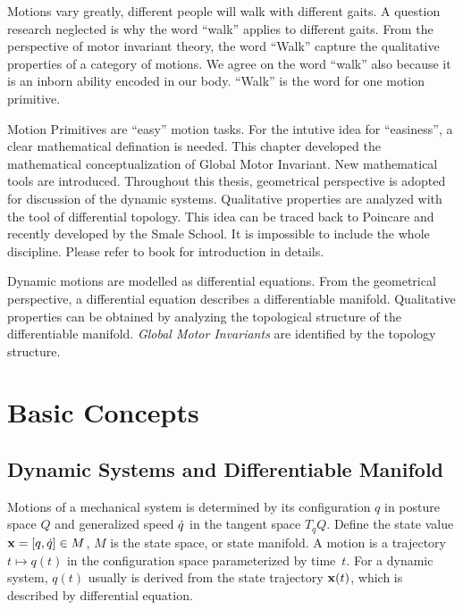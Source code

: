 \graphicspath{{GlobalInvariant/GlobalInvariantFigs/EPS/}{GlobalInvariant/GlobalInvariantFigs/}}


Motions vary greatly, different people will walk with different gaits. 
A question \cms research neglected is why the word ``walk'' applies to different gaits.
From the perspective of motor invariant theory, the word ``Walk'' capture the qualitative properties of a category of motions.
We agree on the word ``walk'' also because it is an inborn ability encoded in our body.
``Walk'' is the word for one motion primitive.


Motion Primitives are ``easy'' motion tasks. 
For the intutive idea for  ``easiness'', a clear mathematical defination is needed.
This chapter developed the mathematical conceptualization of Global Motor Invariant.
New mathematical tools are introduced.
Throughout this thesis,  geometrical perspective is adopted for discussion of the dynamic systems.
Qualitative properties are analyzed with the tool of differential topology.
This idea can be traced back to Poincare\citep{Poincar'e1899,Poincar'e1885} and recently developed by the Smale School\citep{Smale1970}.
It is impossible to include the whole discipline.
Please refer to book \citep{abraham1978foundations}for introduction in details.


Dynamic motions are modelled as differential equations.
From the geometrical perspective, a differential equation describes a differentiable manifold.
Qualitative properties can be obtained by analyzing the topological structure of the differentiable manifold.
\emph{Global Motor Invariants} are identified by the topology structure.


\section{Basic Concepts}



\subsection{Dynamic Systems and Differentiable Manifold}
Motions of a mechanical system is determined by its configuration  $q$ in posture space $Q$ and generalized speed $\dot{q}$ in the tangent space $T_{q}Q$. 
Define the state value $\mathbf{x}=[q,\dot{q}] \in M$,  $M$ is the state space, or state manifold.
A motion is a trajectory $t \mapsto q(t)$ in the configuration space parameterized by time~$t$.
For a dynamic system, $q(t)$ usually is derived from the state trajectory $\mathbf{x}(t)$, which is described by differential equation. 



